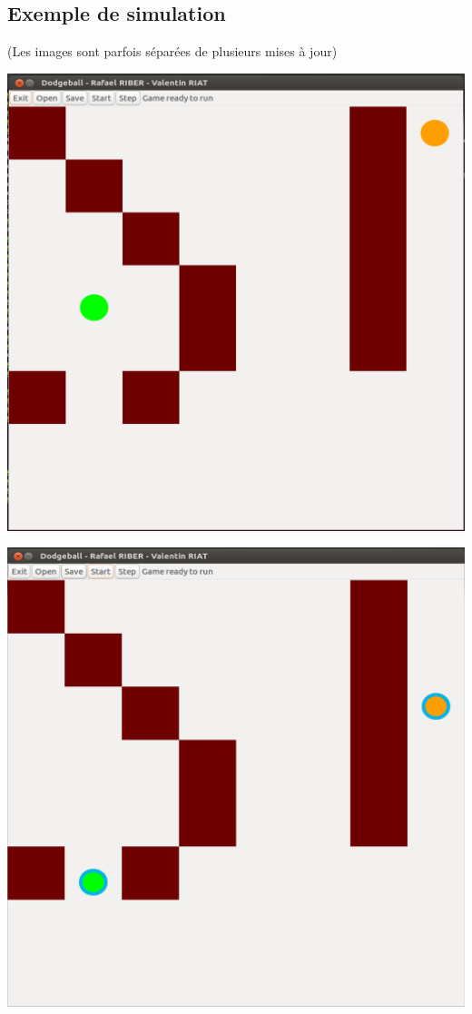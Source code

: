 \documentclass[a4paper, 11pt]{article}
\begin{document}
\subsection{Exemple de simulation}
(Les images sont parfois séparées de plusieurs mises à jour)\\
\begin{minipage}{0.33333333\textwidth}
\includegraphics[width=\textwidth]{figures/sim1.PNG}
\end{minipage}
\begin{minipage}{0.33333333\textwidth}
\includegraphics[width=\textwidth]{figures/sim2.PNG}
\end{minipage}
\end{document}
